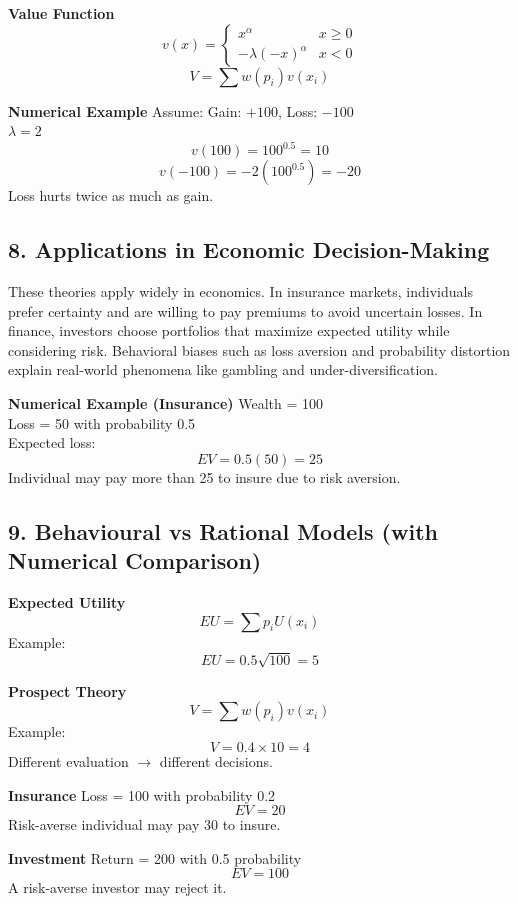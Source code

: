\documentclass[12pt,a4paper]{article}
\begin{document}
\textbf{Value Function}
\[ v(x) = \begin{cases} x^\alpha & x \ge 0 \\ -\lambda(-x)^\alpha & x < 0 \end{cases} \]
\[ V = \sum w(p_i)v(x_i) \]

\textbf{Numerical Example}
Assume:
Gain: $+100$, Loss: $-100$ \\
$\lambda = 2$ \\
\[ v(100) = 100^{0.5} = 10 \]
\[ v(-100) = -2(100^{0.5}) = -20 \]
Loss hurts twice as much as gain.

\subsection*{8. Applications in Economic Decision-Making}
These theories apply widely in economics. In insurance markets, individuals prefer certainty and are willing to pay premiums to avoid uncertain losses. In finance, investors choose portfolios that maximize expected utility while considering risk. Behavioral biases such as loss aversion and probability distortion explain real-world phenomena like gambling and under-diversification.

\textbf{Numerical Example (Insurance)}
Wealth = 100 \\
Loss = 50 with probability 0.5 \\
Expected loss:
\[ EV = 0.5(50) = 25 \]
Individual may pay more than 25 to insure due to risk aversion.

\subsection*{9. Behavioural vs Rational Models (with Numerical Comparison)}
\textbf{Expected Utility}
\[ EU = \sum p_i U(x_i) \]
Example:
\[ EU = 0.5 \sqrt{100} = 5 \]

\textbf{Prospect Theory}
\[ V = \sum w(p_i) v(x_i) \]
Example:
\[ V = 0.4 \times 10 = 4 \]
Different evaluation $\rightarrow$ different decisions.

\textbf{Insurance}
Loss = 100 with probability 0.2 \\
\[ EV = 20 \]
Risk-averse individual may pay 30 to insure.

\textbf{Investment}
Return = 200 with 0.5 probability \\
\[ EV = 100 \]
A risk-averse investor may reject it.
\end{document}
